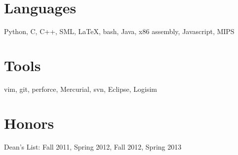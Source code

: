 \documentclass[margin]{res}
\begin{document}
\begin{resume}
\section{Languages}
    Python, C, C++, SML, \LaTeX, bash, Java, x86 assembly, Javascript, MIPS
\section{Tools}
    vim, git, perforce, Mercurial, svn, Eclipse, Logisim
\section{Honors}
Dean's List: Fall 2011, Spring 2012, Fall 2012, Spring 2013 \\

\end{resume}
\end{document}
